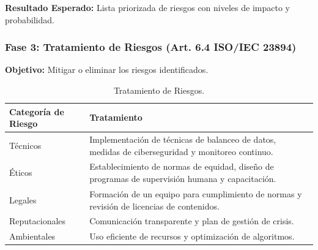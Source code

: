 \documentclass[12pt]{article}
\begin{document}
\textbf{Resultado Esperado:} Lista priorizada de riesgos con niveles de impacto y probabilidad.

\subsubsection{Fase 3: Tratamiento de Riesgos (Art. 6.4 ISO/IEC 23894)}
\textbf{Objetivo:} Mitigar o eliminar los riesgos identificados.

\begin{table}[h]
    \centering
    \begin{tabular}{p{3cm}p{11cm}}
        \toprule
        \textbf{Categoría de Riesgo} & \textbf{Tratamiento} \\
        \midrule
        Técnicos & Implementación de técnicas de balanceo de datos, medidas de ciberseguridad y monitoreo continuo. \\
        Éticos & Establecimiento de normas de equidad, diseño de programas de supervisión humana y capacitación. \\
        Legales & Formación de un equipo para cumplimiento de normas y revisión de licencias de contenidos. \\
        Reputacionales & Comunicación transparente y plan de gestión de crisis. \\
        Ambientales & Uso eficiente de recursos y optimización de algoritmos. \\
        \bottomrule
    \end{tabular}
    \caption{Tratamiento de Riesgos.}
    \label{tab:tratamiento_riesgos}
\end{table}
\end{document}
